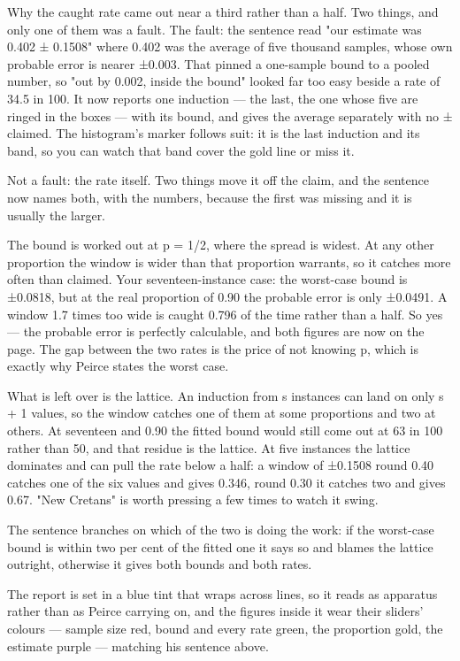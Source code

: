 Why the caught rate came out near a third rather than a half. Two things, and
only one of them was a fault. The fault: the sentence read "our estimate was
0.402 ± 0.1508" where 0.402 was the average of five thousand samples, whose own
probable error is nearer ±0.003. That pinned a one-sample bound to a pooled
number, so "out by 0.002, inside the bound" looked far too easy beside a rate of
34.5 in 100. It now reports one induction — the last, the one whose five are
ringed in the boxes — with its bound, and gives the average separately with no ±
claimed. The histogram's marker follows suit: it is the last induction and its
band, so you can watch that band cover the gold line or miss it.

Not a fault: the rate itself. Two things move it off the claim, and the sentence
now names both, with the numbers, because the first was missing and it is
usually the larger.

The bound is worked out at p = 1/2, where the spread is widest. At any other
proportion the window is wider than that proportion warrants, so it catches more
often than claimed. Your seventeen-instance case: the worst-case bound is
±0.0818, but at the real proportion of 0.90 the probable error is only ±0.0491.
A window 1.7 times too wide is caught 0.796 of the time rather than a half. So
yes — the probable error is perfectly calculable, and both figures are now on
the page. The gap between the two rates is the price of not knowing p, which is
exactly why Peirce states the worst case.

What is left over is the lattice. An induction from s instances can land on only
s + 1 values, so the window catches one of them at some proportions and two at
others. At seventeen and 0.90 the fitted bound would still come out at 63 in 100
rather than 50, and that residue is the lattice. At five instances the lattice
dominates and can pull the rate below a half: a window of ±0.1508 round 0.40
catches one of the six values and gives 0.346, round 0.30 it catches two and
gives 0.67. "New Cretans" is worth pressing a few times to watch it swing.

The sentence branches on which of the two is doing the work: if the worst-case
bound is within two per cent of the fitted one it says so and blames the lattice
outright, otherwise it gives both bounds and both rates.

The report is set in a blue tint that wraps across lines, so it reads as
apparatus rather than as Peirce carrying on, and the figures inside it wear
their sliders' colours — sample size red, bound and every rate green, the
proportion gold, the estimate purple — matching his sentence above.

